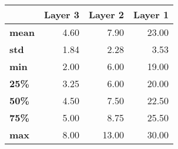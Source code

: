 \begin{tabular}{lrrr}
\toprule
{} &  Layer 3 &  Layer 2 &  Layer 1 \\
\midrule
\textbf{mean} &     4.60 &     7.90 &    23.00 \\
\textbf{std } &     1.84 &     2.28 &     3.53 \\
\textbf{min } &     2.00 &     6.00 &    19.00 \\
\textbf{25\% } &     3.25 &     6.00 &    20.00 \\
\textbf{50\% } &     4.50 &     7.50 &    22.50 \\
\textbf{75\% } &     5.00 &     8.75 &    25.50 \\
\textbf{max } &     8.00 &    13.00 &    30.00 \\
\bottomrule
\end{tabular}
